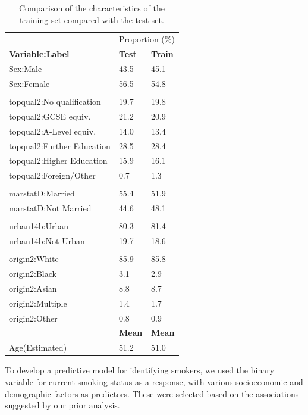 \documentclass[
  11pt,
  twocolumn]{article}
\begin{document}
\begin{table}

\caption{\label{tab:outputtesttraintable}Comparison of the characteristics of the training set compared with the test set.\label{tab:output-testtrain-table}}
\centering
\fontsize{10}{12}\selectfont
\begin{tabular}[t]{l|l|l}
\hline
\multicolumn{1}{c|}{ } & \multicolumn{2}{c}{Proportion (\%)} \\
\cline{2-3}
\textbf{Variable:Label} & \textbf{Test} & \textbf{Train}\\
\hline
Sex:Male & 43.5 & 45.1\\
\hline
Sex:Female & 56.5 & 54.8\\
\hline
 &  \vphantom{3} & \\
\hline
topqual2:No qualification & 19.7 & 19.8\\
\hline
topqual2:GCSE equiv. & 21.2 & 20.9\\
\hline
topqual2:A-Level equiv. & 14.0 & 13.4\\
\hline
topqual2:Further Education & 28.5 & 28.4\\
\hline
topqual2:Higher Education & 15.9 & 16.1\\
\hline
topqual2:Foreign/Other & 0.7 & 1.3\\
\hline
 &  \vphantom{2} & \\
\hline
marstatD:Married & 55.4 & 51.9\\
\hline
marstatD:Not Married & 44.6 & 48.1\\
\hline
 &  \vphantom{1} & \\
\hline
urban14b:Urban & 80.3 & 81.4\\
\hline
urban14b:Not Urban & 19.7 & 18.6\\
\hline
 &  & \\
\hline
origin2:White & 85.9 & 85.8\\
\hline
origin2:Black & 3.1 & 2.9\\
\hline
origin2:Asian & 8.8 & 8.7\\
\hline
origin2:Multiple & 1.4 & 1.7\\
\hline
origin2:Other & 0.8 & 0.9\\
\hline
\textbf{} & \textbf{Mean} & \textbf{Mean}\\
\hline
Age(Estimated) & 51.2 & 51.0\\
\hline
\end{tabular}
\end{table}

To develop a predictive model for identifying smokers, we used the
binary variable for current smoking status as a response, with various
socioeconomic and demographic factors as predictors. These were selected
based on the associations suggested by our prior analysis.
\end{document}
